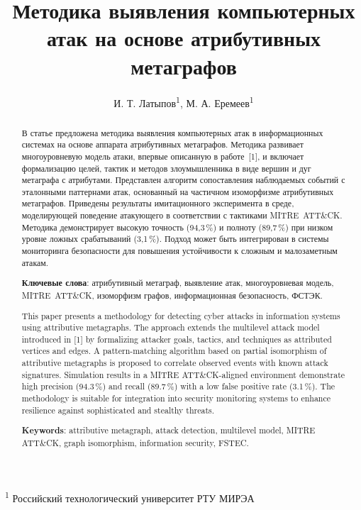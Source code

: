 \documentclass[12pt,a4paper]{extarticle}
\author{И. Т. Латыпов\textsuperscript{1}, М. А. Еремеев\textsuperscript{1}}
\date{}
\begin{document}
\title{Методика выявления компьютерных атак на основе атрибу\-тив\-ных метаграфов}
\maketitle

\begin{center}
\textsuperscript{1} Российский технологический университет РТУ МИРЭА 
\end{center}

\begin{abstract}
В статье предложена методика выявления компьютерных атак в информационных системах на основе аппарата атрибу\-тив\-ных метаграфов. Методика развивает много\-уров\-не\-вую модель атаки, впервые описанную в работе~[1], и включает формализацию целей, тактик и методов злоумышленника в виде вершин и дуг метаграфа с атрибутами. Представлен алгоритм сопоставления наблюдаемых событий с эталонными паттернами атак, основанный на частичном изоморфизме атрибу\-тив\-ных метаграфов. Приведены результаты имитационного эксперимента в среде, моделирующей поведение атакующего в соответствии с тактиками MITRE~ATT\&CK. Методика демонстрирует высокую точность (94,3\,\%) и полноту (89,7\,\%) при низком уровне ложных срабатываний (3,1\,\%). Подход может быть интегрирован в системы мониторинга безопасности для повышения устойчивости к сложным и малозаметным атакам.

\vspace{0.3em}
\noindent\textbf{Ключевые слова}: атрибу\-тив\-ный метаграф, выявление атак, много\-уров\-не\-вая модель, MITRE~ATT\&CK, изоморфизм графов, информационная безопасность, ФСТЭК.
\end{abstract}

\begin{abstract}
This paper presents a methodology for detecting cyber attacks in information systems using attributive metagraphs. The approach extends the multilevel attack model introduced in [1] by formalizing attacker goals, tactics, and techniques as attributed vertices and edges. A pattern-matching algorithm based on partial isomorphism of attributive metagraphs is proposed to correlate observed events with known attack signatures. Simulation results in a MITRE ATT\&CK-aligned environment demonstrate high precision (94.3\,\%) and recall (89.7\,\%) with a low false positive rate (3.1\,\%). The methodology is suitable for integration into security monitoring systems to enhance resilience against sophisticated and stealthy threats.

\vspace{0.3em}
\noindent\textbf{Keywords}: attributive metagraph, attack detection, multilevel model, MITRE ATT\&CK, graph isomorphism, information security, FSTEC.
\end{abstract}
\end{document}
